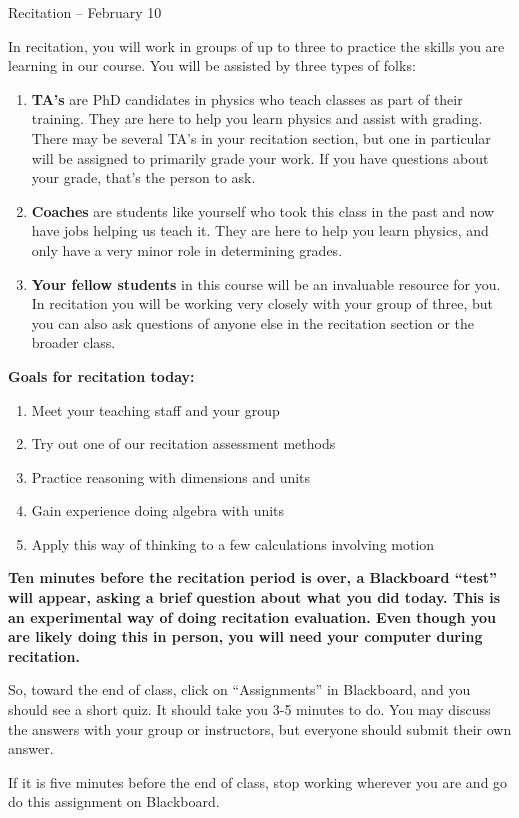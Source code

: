 \documentclass[12pt]{article}
\newcommand{\BE}{\begin{enumerate}}
\newcommand{\EE}{\end{enumerate}}
\begin{document}
	\begin{center}\sc \Large Recitation -- February 10 \end{center}
	
	In recitation, you will work in groups of up to three to practice the skills you are learning in our course. You will be assisted by three types of folks:
	
	\BE
	\item {\bf TA's} are PhD candidates in physics who teach classes as part of their training. They are here to help you learn physics and assist with grading. There may be several TA's in your recitation section, but one in particular will be assigned to primarily grade your work. If you have questions about your grade, that's the person to ask.
	
	\item {\bf Coaches} are students like yourself who took this class in the past and now have jobs helping us teach it. They are here to help you learn physics, and only have a very minor role in determining grades.
	
	\item {\bf Your fellow students} in this course will be an invaluable resource for you. In recitation you will be working very closely with your group of three, but you can also ask questions of anyone else in the recitation section or the broader class. 
	\EE
	
\vspace{0.5in}
	
	{\bf Goals for recitation today:}
	
	
	\BE
	\item Meet your teaching staff and your group
	\item Try out one of our recitation assessment methods
	\item Practice reasoning with dimensions and units
	\item Gain experience doing algebra with units
	\item Apply this way of thinking to a few calculations involving motion
	\EE
	
	\bigskip
	
	\begin{center}
		\bfseries
		Ten minutes before the recitation period is over, a Blackboard ``test'' will appear, asking a brief question about what you did today. This is an experimental way of doing recitation evaluation. Even though you are likely doing this in person, you will need your computer during recitation.
		
		So, toward the end of class, click on ``Assignments'' in Blackboard, and you should see a short quiz. It should take you 3-5 minutes to do. You may discuss the answers with your group or instructors, but everyone should submit their own answer.
		
		If it is five minutes before the end of class, stop working wherever you are and go do this assignment on Blackboard.
	\end{center}
\end{document}
